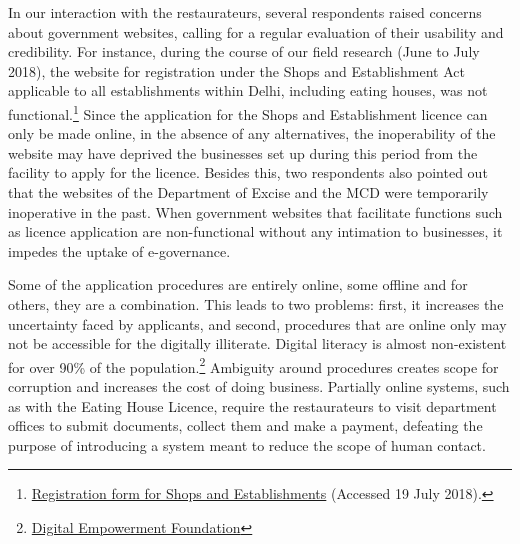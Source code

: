 \documentclass[a4paper, 12pt]{article}
\begin{document}
		In our interaction with the restaurateurs, several respondents raised concerns about government websites, calling for a regular evaluation of their usability and credibility. For instance, during the course of our field research (June to July 2018), the 
website for registration under the Shops and Establishment Act applicable to all establishments within Delhi, including eating houses, was not functional.\footnote{\href{https://bit.ly/2xfB6UJ}{Registration form for Shops and Establishments} (Accessed 19 July 
2018).} Since the application for the Shops and Establishment licence can only be made online, in the absence of any alternatives, the inoperability of the website may have deprived the businesses set up during this period from the facility to apply for the licence. 
Besides this, two respondents also pointed out that the websites of the Department of Excise and the MCD were temporarily inoperative in the past. When government websites that facilitate functions such as licence application are non-functional without any 
intimation to businesses, it impedes the uptake of e-governance.
		
		Some of the application procedures are entirely online, some offline and for others, they are a combination. This leads to two problems: first, it increases the uncertainty faced by applicants, and second, procedures that are online only may not be 
accessible for the digitally illiterate. Digital literacy is almost non-existent for over 90\% of the population.\footnote{\href{https://bit.ly/2NMWdaj}{Digital Empowerment Foundation}}  Ambiguity around procedures creates scope for corruption and increases the cost of 
doing business. Partially online systems, such as with the Eating House Licence, require the restaurateurs to visit department offices to submit documents, collect them and make a payment, defeating the purpose of introducing a system meant to reduce the scope 
of human contact.
		
\end{document}
